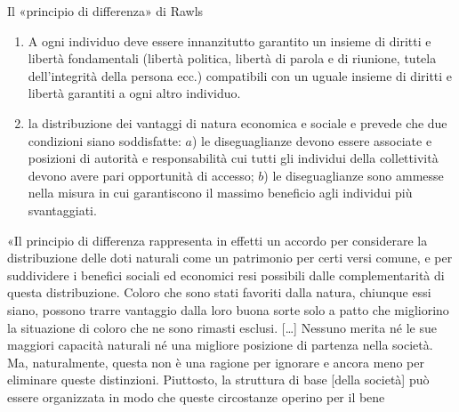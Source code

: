 \documentclass[aspectratio=64,11pt]{beamer}
\begin{document}
\begin{frame}{Il «principio di differenza» di Rawls}
\begin{enumerate}
\item A ogni individuo deve essere innanzitutto garantito un insieme di diritti
e libertà fondamentali (libertà politica, libertà di parola e di
riunione, tutela dell'integrità della persona ecc.) compatibili con un
uguale insieme di diritti e libertà garantiti a ogni altro individuo.
\item la distribuzione dei vantaggi di natura economica e sociale e prevede che
due condizioni siano soddisfatte: $a$) le diseguaglianze devono essere
associate e posizioni di autorità e responsabilità cui tutti gli
individui della collettività devono avere pari opportunità di accesso;
$b$) le diseguaglianze sono ammesse nella misura in cui garantiscono il
massimo beneficio agli individui più svantaggiati.
\end{enumerate}

\begin{quoting}
\begin{spacing}{.8}\footnotesize
  «Il principio di differenza rappresenta in effetti un accordo per considerare la distribuzione delle doti naturali come un patrimonio per certi versi comune, e per suddividere i benefici sociali ed economici resi possibili dalle complementarità di questa distribuzione. Coloro che sono stati favoriti dalla natura, chiunque essi siano, possono trarre vantaggio dalla loro buona sorte solo a patto che migliorino la situazione di coloro che ne sono rimasti esclusi. [\dots] Nessuno merita né le sue maggiori capacità naturali né una migliore posizione di partenza nella società. Ma, naturalmente, questa non è una ragione per ignorare e ancora meno per eliminare queste distinzioni. Piuttosto, la struttura di base [della società] può essere organizzata in modo che queste circostanze operino per il bene
\end{spacing}
\end{quoting}
\end{frame}
\end{document}
